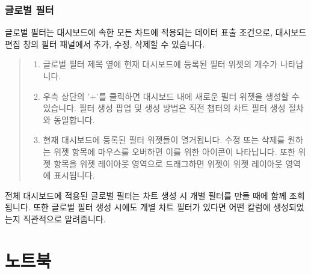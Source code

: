 \documentclass[letterpaper,10pt,english]{sphinxmanual}
\begin{document}
\subsection{글로벌 필터}
\label{\detokenize{discovery/part04/global_filter:id1}}\label{\detokenize{discovery/part04/global_filter::doc}}
글로벌 필터는 대시보드에 속한 모든 차트에 적용되는 데이터 표출 조건으로, 대시보드 편집 창의 필터 패널에서 추가, 수정, 삭제할 수 있습니다.
\begin{quote}

\begin{figure}[H]
\centering

\noindent{}
\end{figure}
\begin{enumerate}
\def\theenumi{\arabic{enumi}}
\def\labelenumi{\theenumi .}
\makeatletter\def\p@enumii{\p@enumi \theenumi .}\makeatother
\item {} 
 글로벌 필터 제목 옆에 현재 대시보드에 등록된 필터 위젯의 개수가 나타납니다.

\item {} 
 우측 상단의 '+'를 클릭하면 대시보드 내에 새로운 필터 위젯을 생성할 수 있습니다. 필터 생성 팝업 및 생성 방법은 직전 챕터의 차트 필터 생성 절차와 동일합니다.

\item {} 
 현재 대시보드에 등록된 필터 위젯들이 열거됩니다. 수정 또는 삭제를 원하는 위젯 항목에 마우스를 오버하면 이를 위한 아이콘이 나타납니다. 또한 위젯 항목을 위젯 레이아웃 영역으로 드래그하면 위젯이 위젯 레이아웃 영역에 표시됩니다.

\end{enumerate}
\end{quote}

전체 대시보드에 적용된 글로벌 필터는 차트 생성 시 개별 필터를 만들 때에 함께 조회됩니다. 또한 글로벌 필터 생성 시에도 개별 차트 필터가 있다면 어떤 칼럼에 생성되었는지 직관적으로 알려줍니다.


\chapter{노트북}
\label{\detokenize{discovery/part05/index:id1}}\label{\detokenize{discovery/part05/index::doc}}
\begin{figure}[H]
\centering

\noindent{}
\end{figure}
\end{document}
